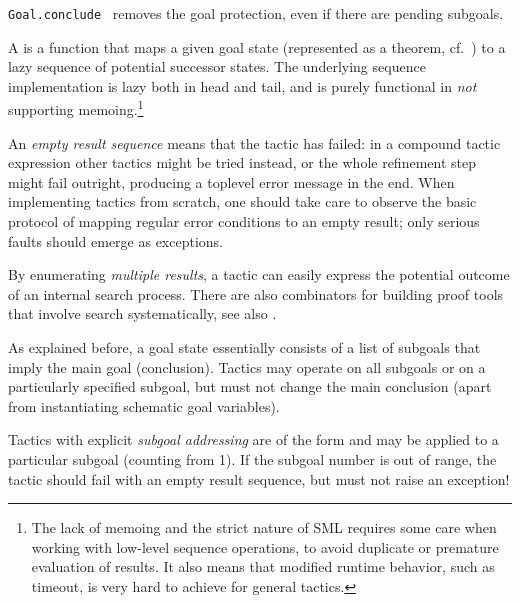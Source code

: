 \begin{isabellebody}
\begin{isamarkuptext}
\begin{description}
  \item \verb|Goal.conclude|~ removes the goal
  protection, even if there are pending subgoals.

  \end{description}%
\end{isamarkuptext}%
\isamarkuptrue%
%
\endisatagmlref
{\isafoldmlref}%
%
\isadelimmlref
%
\endisadelimmlref
%
\isamarkuptrue%
%
\begin{isamarkuptext}%
A  is a function  that
  maps a given goal state (represented as a theorem, cf.\
  ) to a lazy sequence of potential
  successor states.  The underlying sequence implementation is lazy
  both in head and tail, and is purely functional in \emph{not}
  supporting memoing.\footnote{The lack of memoing and the strict
  nature of SML requires some care when working with low-level
  sequence operations, to avoid duplicate or premature evaluation of
  results.  It also means that modified runtime behavior, such as
  timeout, is very hard to achieve for general tactics.}

  An \emph{empty result sequence} means that the tactic has failed: in
  a compound tactic expression other tactics might be tried instead,
  or the whole refinement step might fail outright, producing a
  toplevel error message in the end.  When implementing tactics from
  scratch, one should take care to observe the basic protocol of
  mapping regular error conditions to an empty result; only serious
  faults should emerge as exceptions.

  By enumerating \emph{multiple results}, a tactic can easily express
  the potential outcome of an internal search process.  There are also
  combinators for building proof tools that involve search
  systematically, see also .

  \medskip As explained before, a goal state essentially consists of a
  list of subgoals that imply the main goal (conclusion).  Tactics may
  operate on all subgoals or on a particularly specified subgoal, but
  must not change the main conclusion (apart from instantiating
  schematic goal variables).

  Tactics with explicit \emph{subgoal addressing} are of the form
   and may be applied to a particular subgoal
  (counting from 1).  If the subgoal number is out of range, the
  tactic should fail with an empty result sequence, but must not raise
  an exception!


\end{isamarkuptext}
\end{isabellebody}
